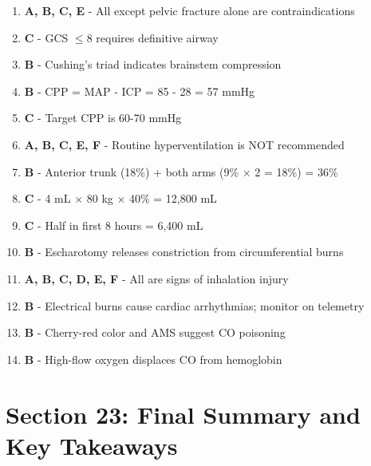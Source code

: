 \documentclass[11pt]{article}
\begin{document}
\begin{enumerate}
    \item \textbf{A, B, C, E} - All except pelvic fracture alone are contraindications
    \item \textbf{C} - GCS $\leq$8 requires definitive airway
    \item \textbf{B} - Cushing's triad indicates brainstem compression
    \item \textbf{B} - CPP = MAP - ICP = 85 - 28 = 57 mmHg
    \item \textbf{C} - Target CPP is 60-70 mmHg
    \item \textbf{A, B, C, E, F} - Routine hyperventilation is NOT recommended
    \item \textbf{B} - Anterior trunk (18\%) + both arms (9\% × 2 = 18\%) = 36\%
    \item \textbf{C} - 4 mL × 80 kg × 40\% = 12,800 mL
    \item \textbf{C} - Half in first 8 hours = 6,400 mL
    \item \textbf{B} - Escharotomy releases constriction from circumferential burns
    \item \textbf{A, B, C, D, E, F} - All are signs of inhalation injury
    \item \textbf{B} - Electrical burns cause cardiac arrhythmias; monitor on telemetry
    \item \textbf{B} - Cherry-red color and AMS suggest CO poisoning
    \item \textbf{B} - High-flow oxygen displaces CO from hemoglobin
\end{enumerate}

\newpage
\section*{Section 23: Final Summary and Key Takeaways}
\end{document}
